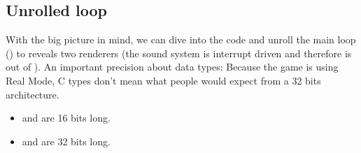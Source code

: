 \documentclass[book.tex]{subfiles}
\begin{document}
 









\subsection{Unrolled loop}
With the big picture in mind, we can dive into the code and unroll the main loop () to reveals two renderers (the sound system is interrupt driven and therefore is out of ). An important precision about data types: Because the game is using Real Mode, C types don't mean what people would expect from a 32 bits architecture.\\
\begin{itemize}
\item {} and  are 16 bits long.
\item {} and  are 32 bits long.
\end{itemize}

\par
\begin{minipage}{\textwidth}

\end{minipage}
\par
\end{document}
